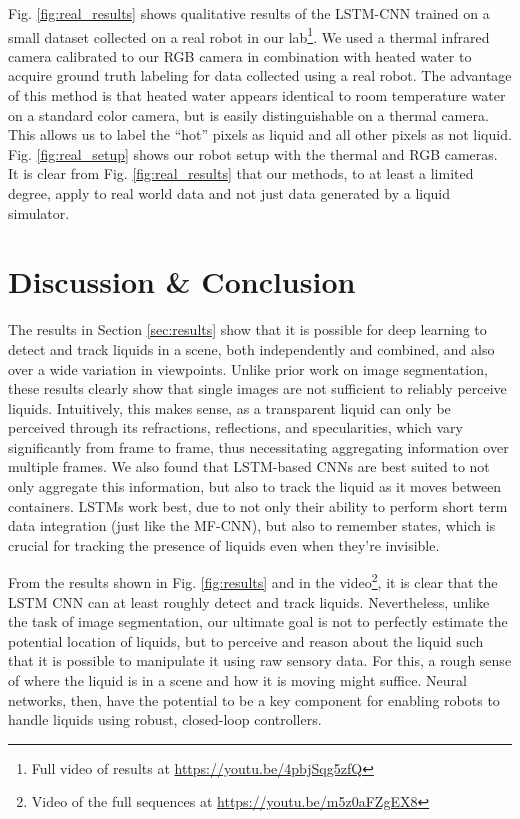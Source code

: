 \documentclass[runningheads,a4paper]{llncs}
\newcommand{\youtubeurl}{https://youtu.be/m5z0aFZgEX8}
\begin{document}
Fig. \ref{fig:real_results} shows qualitative results of the LSTM-CNN trained on a small dataset collected on a real robot in our lab\footnote{Full video of results at \url{https://youtu.be/4pbjSqg5zfQ}}.
We used a thermal infrared camera calibrated to our RGB camera in combination with heated water to acquire ground truth labeling for data collected using a real robot.
The advantage of this method is that heated water appears identical to room temperature water on a standard color camera, but is easily distinguishable on a thermal camera.
This allows us to label the ``hot'' pixels as liquid and all other pixels as not liquid.
Fig. \ref{fig:real_setup} shows our robot setup with the thermal and RGB cameras. 
It is clear from Fig. \ref{fig:real_results} that our methods, to at least a limited degree, apply to real world data and not just data generated by a liquid simulator.

\vspace{-0.5cm}
\section{Discussion \& Conclusion}
\label{sec:conclusion}
\vspace{-0.3cm}

The results in Section \ref{sec:results} show that it is possible for deep learning to detect and track liquids in a scene, both independently and combined, and also over a wide variation in viewpoints.
Unlike prior work on image segmentation, these results clearly show that single images are not sufficient to reliably perceive liquids. 
Intuitively, this makes sense, as a transparent liquid can only be perceived through its refractions, reflections, and specularities, which vary significantly from frame to frame, thus necessitating aggregating information over multiple frames. 
We also found that LSTM-based CNNs are best suited to not only aggregate this information, but also to track the liquid as it moves between containers. 
LSTMs work best, due to not only their ability to perform short term data integration (just like the MF-CNN), but also to remember states, which is crucial for tracking the presence of liquids even when they're invisible.

From the results shown in Fig. \ref{fig:results} and in the video\footnote{Video of the full sequences at \url{\youtubeurl}}, it is clear that the LSTM CNN can at least roughly detect and track liquids.
Nevertheless, unlike the task of image segmentation, our ultimate goal is not to perfectly estimate the potential location of liquids, but to perceive and reason about the liquid such that it is possible to manipulate it using raw sensory data.  
For this, a rough sense of where the liquid is in a scene and how it is moving might suffice.  
Neural networks, then, have the potential to be a key component for enabling robots to handle liquids using robust, closed-loop controllers.
\end{document}
